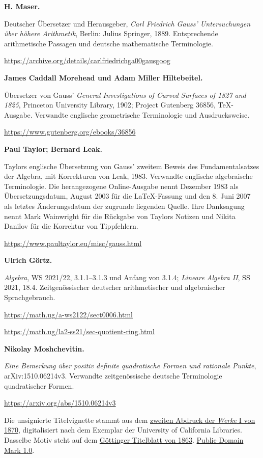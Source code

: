 \par\medskip\noindent\textbf{H. Maser.}\par\nobreak\smallskip\noindent Deutscher Übersetzer und Herausgeber, \emph{Carl Friedrich Gauss' Untersuchungen über höhere Arithmetik}, Berlin: Julius Springer, 1889. Entsprechende arithmetische Passagen und deutsche mathematische Terminologie.\par
\url{https://archive.org/details/carlfriedrichga00gausgoog}
\par\medskip\noindent\textbf{James Caddall Morehead und Adam Miller Hiltebeitel.}\par\nobreak\smallskip\noindent Übersetzer von Gauss' \emph{General Investigations of Curved Surfaces of 1827 and 1825}, Princeton University Library, 1902; Project Gutenberg 36856, TeX-Ausgabe. Verwandte englische geometrische Terminologie und Ausdrucksweise.\par
\url{https://www.gutenberg.org/ebooks/36856}
\par\medskip\noindent\textbf{Paul Taylor; Bernard Leak.}\par\nobreak\smallskip\noindent Taylors englische Übersetzung von Gauss' zweitem Beweis des Fundamentalsatzes der Algebra, mit Korrekturen von Leak, 1983. Verwandte englische algebraische Terminologie. Die herangezogene Online-Ausgabe nennt Dezember 1983 als Übersetzungsdatum, August 2003 für die LaTeX-Fassung und den 8. Juni 2007 als letztes Änderungsdatum der zugrunde liegenden Quelle. Ihre Danksagung nennt Mark Wainwright für die Rückgabe von Taylors Notizen und Nikita Danilov für die Korrektur von Tippfehlern.\par
\url{https://www.paultaylor.eu/misc/gauss.html}
\par\medskip\noindent\textbf{Ulrich Görtz.}\par\nobreak\smallskip\noindent \emph{Algebra}, WS 2021/22, 3.1.1–3.1.3 und Anfang von 3.1.4; \emph{Lineare Algebra II}, SS 2021, 18.4. Zeitgenössischer deutscher arithmetischer und algebraischer Sprachgebrauch.\par
\url{https://math.ug/a-ws2122/sect0006.html}\par
\url{https://math.ug/la2-ss21/sec-quotient-ring.html}
\par\medskip\noindent\textbf{Nikolay Moshchevitin.}\par\nobreak\smallskip\noindent \emph{Eine Bemerkung über positiv definite quadratische Formen und rationale Punkte}, arXiv:1510.06214v3. Verwandte zeitgenössische deutsche Terminologie quadratischer Formen.\par
\url{https://arxiv.org/abs/1510.06214v3}



\par\medskip\noindent Die unsignierte Titelvignette stammt aus dem \href{https://commons.wikimedia.org/w/index.php?oldid=1179960952}{zweiten Abdruck der \textit{Werke} I von 1870}, digitalisiert nach dem Exemplar der University of California Libraries. Dasselbe Motiv steht auf dem \href{https://gdz.sub.uni-goettingen.de/id/PPN235993352}{Göttinger Titelblatt von 1863}. \href{https://creativecommons.org/publicdomain/mark/1.0/}{Public Domain Mark 1.0}.
\clearpage\endgroup\clearpage
\setcounter{page}{\the\SavedTranslationPage}
\hypersetup{pageanchor=true}
